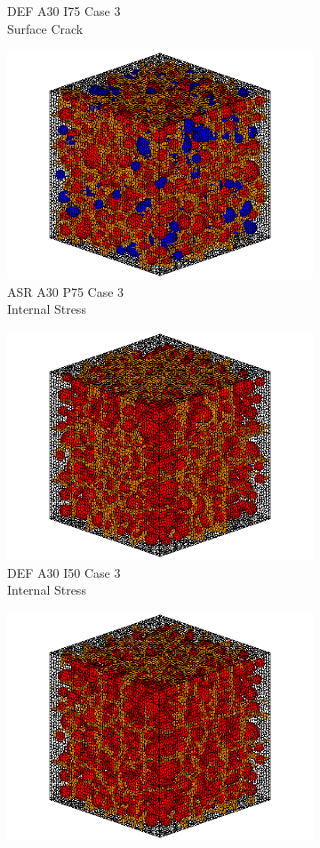 \begin{figure}[ht]
\begin{subfigure}{.33\textwidth}
      \caption{DEF A30 I75 Case 3 \\ Surface Crack}
    \end{subfigure}
    \begin{subfigure}{.33\textwidth}
      \centering
      \includegraphics[width=0.8\linewidth]{Files/exp_3D/ASR/A30P75_3_c.png}
      \caption{ASR A30 P75 Case 3 \\ Internal Stress}
    \end{subfigure}%
    \begin{subfigure}{.33\textwidth}
      \centering
      \includegraphics[width=0.8\linewidth]{Files/exp_3D/DEF/A30X0C_3_c.png}
      \caption{DEF A30 I50 Case 3 \\ Internal Stress}
    \end{subfigure}%
    \begin{subfigure}{.33\textwidth}
      \centering
      \includegraphics[width=0.8\linewidth]{Files/exp_3D/DEF/A30X-5C_3_c.png}

\end{subfigure}
\end{figure}
